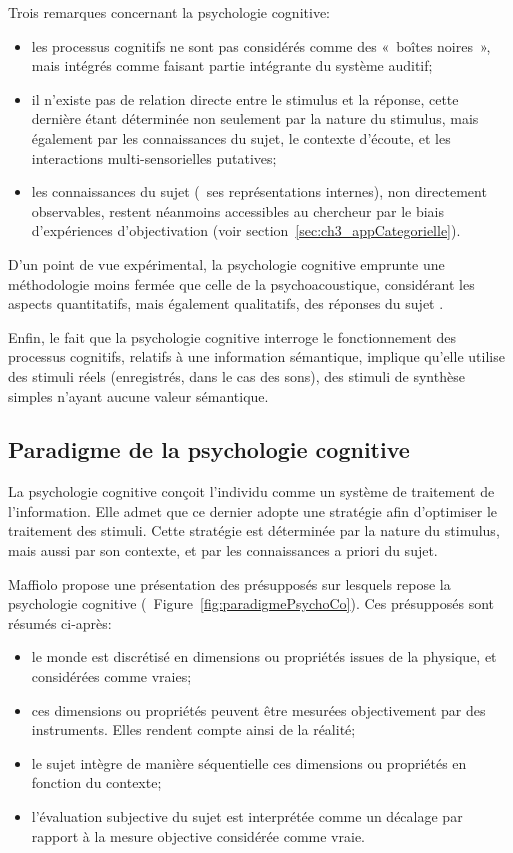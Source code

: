 Trois remarques concernant la psychologie cognitive:

\begin{itemize}
\item les processus cognitifs ne sont pas considérés comme des «~boîtes noires~», mais intégrés comme faisant partie intégrante du système auditif;
\item il n'existe pas de relation directe entre le stimulus et la réponse, cette dernière étant déterminée non seulement par la nature du stimulus, mais également par les connaissances du sujet, le contexte d'écoute, et les interactions multi-sensorielles putatives;
\item les connaissances du sujet (\ie~ses représentations internes), non directement observables, restent néanmoins accessibles au chercheur par le biais d'expériences d'objectivation (voir section~\ref{sec:ch3_appCategorielle}).
\end{itemize}

D'un point de vue expérimental, la psychologie cognitive emprunte une méthodologie moins fermée que celle de la psychoacoustique, considérant les aspects quantitatifs, mais également qualitatifs, des réponses du sujet \citep{maffiolo_marieParis_1997,maffiolo_caracterisation_1999}. 

Enfin, le fait que la psychologie cognitive interroge le fonctionnement des processus cognitifs, relatifs à une information sémantique, implique qu'elle utilise des stimuli réels (enregistrés, dans le cas des sons), des stimuli de synthèse simples n'ayant aucune valeur sémantique.

\subsection{Paradigme de la psychologie cognitive}
\label{sec:ch3_psychoCog}

La psychologie cognitive conçoit l'individu comme un système de traitement de l'information. Elle admet que ce dernier adopte une stratégie afin d'optimiser le traitement des stimuli. Cette stratégie est déterminée par la nature du stimulus, mais aussi par son contexte, et par les connaissances a priori du sujet.

Maffiolo \citep{maffiolo_caracterisation_1999} propose une présentation des présupposés sur lesquels repose la psychologie cognitive (\cf~Figure~\ref{fig:paradigmePsychoCo}). Ces présupposés sont résumés ci-après:

\begin{itemize}
\item le monde est discrétisé en dimensions ou propriétés issues de la physique, et considérées comme vraies;
\item ces dimensions ou propriétés peuvent être mesurées objectivement par des instruments. Elles rendent compte ainsi de la réalité;
\item le sujet intègre de manière séquentielle ces dimensions ou propriétés en fonction du contexte;
\item l'évaluation subjective du sujet est interprétée comme un décalage par rapport à la mesure objective considérée comme vraie.
\end{itemize}

